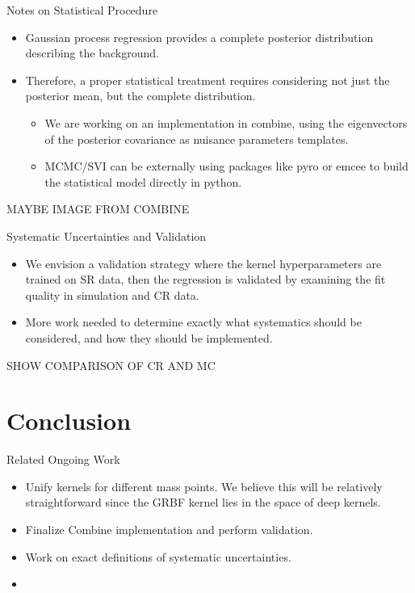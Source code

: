 \documentclass[10pt]{beamer}
\begin{document}
\begin{frame}{Notes on Statistical Procedure}
  \begin{itemize}
  \item Gaussian process regression provides a complete posterior distribution describing the background. 
  \item Therefore, a proper statistical treatment requires considering not just the posterior mean, but the complete distribution.
    \begin{itemize}
    \item We are working on an implementation in combine, using the eigenvectors of the posterior covariance as nuisance parameters templates. 
    \item MCMC/SVI can be externally using packages like pyro or emcee to build the statistical model directly in python.
    \end{itemize}
  \end{itemize}

  MAYBE IMAGE FROM COMBINE
\end{frame}

\begin{frame}{Systematic Uncertainties and Validation}
  \begin{itemize}
  \item We envision a validation strategy where the kernel hyperparameters are trained on SR data, then the regression is validated by examining the fit quality in simulation and CR data.
  \item More work needed to determine exactly what systematics should be considered, and how they should be implemented.
  \end{itemize}


  SHOW COMPARISON OF CR AND MC 
\end{frame}


\section{Conclusion}
\label{sec:conclusion}

\begin{frame}{Related Ongoing Work}
  \begin{itemize}
  \item Unify kernels for different mass points. We believe this will be relatively straightforward since the GRBF kernel lies in the space of deep kernels. 
  \item Finalize Combine implementation and perform validation.
  \item Work on exact definitions of systematic uncertainties.
  \item 
  \end{itemize}
  
\end{frame}
\end{document}
